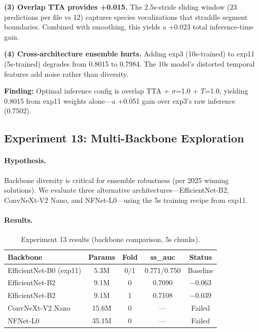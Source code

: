 \textbf{(3) Overlap TTA provides +0.015.}
The 2.5s-stride sliding window (23 predictions per file vs 12) captures
species vocalizations that straddle segment boundaries. Combined with
smoothing, this yields a +0.023 total inference-time gain.

\textbf{(4) Cross-architecture ensemble hurts.}
Adding exp3 (10s-trained) to exp11 (5s-trained) degrades from 0.8015 to 0.7984.
The 10s model's distorted temporal features add noise rather than diversity.

\textbf{Finding:} Optimal inference config is overlap TTA + $\sigma$=1.0 +
$T$=1.0, yielding 0.8015 from exp11 weights alone---a +0.051 gain over
exp3's raw inference (0.7502).

\subsection{Experiment 13: Multi-Backbone Exploration}
\label{sec:exp13}

\paragraph{Hypothesis.}
Backbone diversity is critical for ensemble robustness (per 2025 winning
solutions). We evaluate three alternative architectures---EfficientNet-B2,
ConvNeXt-V2 Nano, and NFNet-L0---using the 5s training recipe from exp11.

\paragraph{Results.}
\begin{table}[h]
\centering
\caption{Experiment 13 results (backbone comparison, 5s chunks).}
\label{tab:exp13}
\begin{tabular}{lcccc}
\hline
\textbf{Backbone} & \textbf{Params} & \textbf{Fold} & \textbf{ss\_auc} & \textbf{Status} \\
\hline
EfficientNet-B0 (exp11) & 5.3M & 0/1 & 0.771/0.750 & Baseline \\
EfficientNet-B2 & 9.1M & 0 & 0.7090 & $-0.063$ \\
EfficientNet-B2 & 9.1M & 1 & 0.7108 & $-0.039$ \\
ConvNeXt-V2 Nano & 15.6M & 0 & --- & Failed \\
NFNet-L0 & 35.1M & 0 & --- & Failed \\
\hline
\end{tabular}
\end{table}

